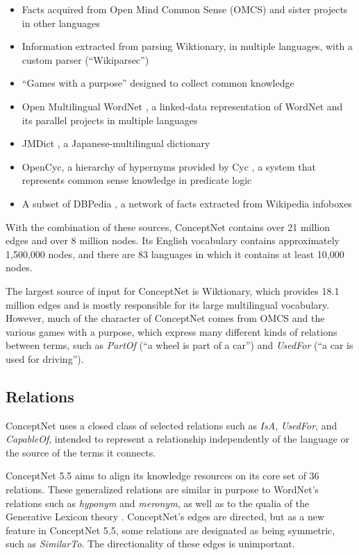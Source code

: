 \documentclass[letterpaper]{article}
\begin{document}
\begin{itemize}
\item
  Facts acquired from Open Mind Common Sense (OMCS) \cite{singh2002omcs}
  and sister projects in other languages \cite{anacleto2006portuguese}
\item
  Information extracted from parsing Wiktionary, in multiple languages,
  with a custom parser (``Wikiparsec'')
\item
  ``Games with a purpose'' designed to collect common knowledge
  \cite{vonahn2006verbosity} \cite{nakahara2011nadya} \cite{kuo2009petgame}
\item
  Open Multilingual WordNet \cite{bond2013linking}, a linked-data
  representation of WordNet \cite{miller1998wordnet} and its parallel
  projects in multiple languages
\item
  JMDict \cite{breen2004jmdict}, a Japanese-multilingual dictionary
\item
  OpenCyc, a hierarchy of hypernyms provided by
  Cyc \cite{lenat1989cyc}, a system that represents common sense knowledge in predicate logic
\item
  A subset of DBPedia \cite{auer2007dbpedia}, a network of facts
  extracted from Wikipedia infoboxes
\end{itemize}

With the combination of these sources, ConceptNet contains over 21
million edges and over 8 million nodes. Its English vocabulary contains
approximately 1,500,000 nodes, and there are 83 languages in which it
contains at least 10,000 nodes.

The largest source of input for ConceptNet is Wiktionary, which provides
18.1 million edges and is mostly responsible for its large multilingual
vocabulary. However, much of the character of ConceptNet comes from OMCS
and the various games with a purpose, which express many different kinds
of relations between terms, such as \emph{PartOf} (``a wheel is part of
a car'') and \emph{UsedFor} (``a car is used for driving'').


\subsection{Relations}\label{relations}

ConceptNet uses a closed class of selected relations such as \emph{IsA},
\emph{UsedFor}, and \emph{CapableOf}, intended to
represent a relationship independently of the language or the source of
the terms it connects.

ConceptNet 5.5 aims to align its knowledge resources on its core set of 36
relations. These generalized relations are similar in purpose to WordNet's
relations such as \emph{hyponym} and \emph{meronym}, as well as to the qualia
of the Generative Lexicon theory \cite{pustejovsky1991generative}.
ConceptNet's edges are directed, but as a new feature in ConceptNet 5.5,
some relations are designated as being symmetric, such as \emph{SimilarTo}.
The directionality of these edges is unimportant.
\end{document}
